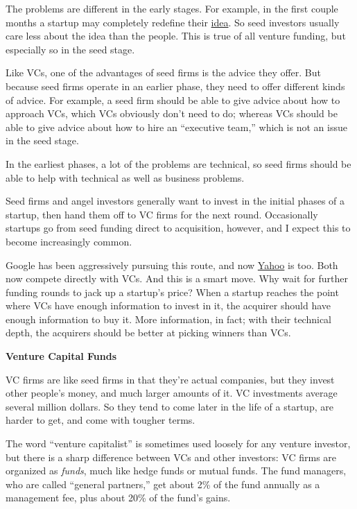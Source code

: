 The problems are different in the early stages. For example, in the
first couple months a startup may completely redefine their
\href{ideas.html}{idea}. So seed investors usually care less about the
idea than the people. This is true of all venture funding, but
especially so in the seed stage.

Like VCs, one of the advantages of seed firms is the advice they offer.
But because seed firms operate in an earlier phase, they need to offer
different kinds of advice. For example, a seed firm should be able to
give advice about how to approach VCs, which VCs obviously don't need to
do; whereas VCs should be able to give advice about how to hire an
``executive team,'' which is not an issue in the seed stage.

In the earliest phases, a lot of the problems are technical, so seed
firms should be able to help with technical as well as business
problems.

Seed firms and angel investors generally want to invest in the initial
phases of a startup, then hand them off to VC firms for the next round.
Occasionally startups go from seed funding direct to acquisition,
however, and I expect this to become increasingly common.

Google has been aggressively pursuing this route, and now
\href{http://ycombinator.com/buckman.html}{Yahoo} is too. Both now
compete directly with VCs. And this is a smart move. Why wait for
further funding rounds to jack up a startup's price? When a startup
reaches the point where VCs have enough information to invest in it, the
acquirer should have enough information to buy it. More information, in
fact; with their technical depth, the acquirers should be better at
picking winners than VCs.

\textbf{Venture Capital Funds}

VC firms are like seed firms in that they're actual companies, but they
invest other people's money, and much larger amounts of it. VC
investments average several million dollars. So they tend to come later
in the life of a startup, are harder to get, and come with tougher
terms.

The word ``venture capitalist'' is sometimes used loosely for any
venture investor, but there is a sharp difference between VCs and other
investors: VC firms are organized as \emph{funds}, much like hedge funds
or mutual funds. The fund managers, who are called ``general partners,''
get about 2\% of the fund annually as a management fee, plus about 20\%
of the fund's gains.


